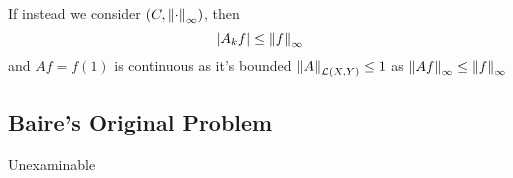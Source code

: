 \documentclass{article}
\begin{document}
\begin{remark}
    If instead we consider $(C, \left\|{\cdot}\right\|_\infty)$, then  
    $$
    |A_k f| \leq \left\|{f}\right\|_{\infty}
    $$
    and $Af=f(1)$ is continuous as it's bounded $\left\|{A}\right\|_{\mathcal{L}(X,Y)}\leq 1$ as $\left\|{Af}\right\|_{\infty} \leq \left\|{f}\right\|_\infty$
\end{remark}

\subsection{Baire's Original Problem}
Unexaminable
\end{document}
